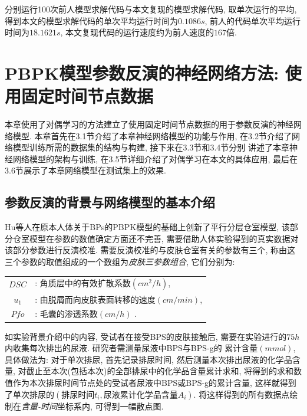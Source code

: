 \documentclass[a4paper,punct=banjiao,twoside]{ctexrep}
\theoremstyle{plain}
\theoremstyle{definition}
\theoremstyle{remark}
\begin{document}
分别运行100次前人模型求解代码与本文复现的模型求解代码, 取单次运行的平均, 得到本文的模型求解代码的单次平均运行时间为$0.1086s$, 前人的代码单次平均运行时间为$18.1621s$,
本文复现代码的运行速度约为前人速度的$167$倍.


\chapter{PBPK模型参数反演的神经网络方法: 使用固定时间节点数据}

本章使用了对偶学习的方法建立了使用固定时间节点数据的用于参数反演的神经网络模型. 本章首先在3.1节介绍了本章神经网络模型的功能与作用, 在3.2节介绍了网络模型训练所需的数据集的结构与构建, 接下来在3.3节和3.4节分别
讲述了本章神经网络模型的架构与训练, 在3.5节详细介绍了对偶学习在本文的具体应用, 最后在3.6节展示了本章网络模型在测试集上的效果.
\section{参数反演的背景与网络模型的基本介绍}
\label{3.1}
Hu等人\cite{11}在原本人体关于BPs的PBPK模型的基础上创新了平行分层仓室模型, 该部分仓室模型在参数的数值确定方面还不完善, 需要借助人体实验得到的真实数据对
该部分参数进行反演校准. 
需要反演校准的与皮肤仓室有关的参数有三个, 称由这三个参数的取值组成的一个数组为\textit{皮肤三参数组合}, 它们分别为:

\begin{table}[htbp]
  \centering
  \begin{tabular}[t]{|c*{1}{l}}

    $DSC$ &: 角质层中的有效扩散系数$(cm^2/h)$, \\ 
  
    $u_1$  &: 由脱屑而向皮肤表面转移的速度$(cm/min)$, \\ 
  
    $Pfo$ &: 毛囊的渗透系数$(cm/h)$ .\\ 

  \end{tabular}
\end{table}  

如实验背景介绍中的内容, 受试者在接受BPS的皮肤接触后, 需要在实验进行的$75h$内收集每次排出的尿液\cite{11}. 研究者需测量尿液中BPS与BPS-g的
累计含量$(mmol)$, 具体做法为: 对于单次排尿, 首先记录排尿时间, 然后测量本次排出尿液的化学品含量, 对截止至本次(包括本次)的全部排尿中的化学品含量累计求和, 
将得到的求和数值作为本次排尿时间节点处的受试者尿液中BPS或BPS-g的累计含量, 这样就得到了单次排尿的$(\textit{排尿时间}t_i, \textit{尿液累计化学品含量}A_i)$. 
将这样得到的所有数据点绘制在\textit{含量-时间}坐标系内, 可得到一幅散点图. 
\end{document}
